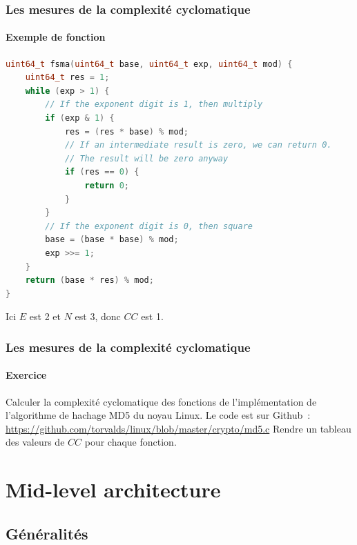 \documentclass{beamer}
\begin{document}
    \begin{frame}[fragile]
        \transdissolve
        \frametitle{Les mesures de la complexité cyclomatique}
        \framesubtitle{Exemple de fonction}
        \begin{lstlisting}[language=c]
uint64_t fsma(uint64_t base, uint64_t exp, uint64_t mod) {
    uint64_t res = 1;
    while (exp > 1) {
        // If the exponent digit is 1, then multiply
        if (exp & 1) {
            res = (res * base) % mod;
            // If an intermediate result is zero, we can return 0.
            // The result will be zero anyway
            if (res == 0) {
                return 0;
            }
        }
        // If the exponent digit is 0, then square
        base = (base * base) % mod;
        exp >>= 1;
    }
    return (base * res) % mod;
}
        \end{lstlisting}

        Ici $E$ est 2 et $N$ est 3, donc $CC$ est 1.
    \end{frame}

    \begin{frame}[fragile]
        \transdissolve
        \frametitle{Les mesures de la complexité cyclomatique}
        \framesubtitle{Exercice \execcounterdispinc{}}
        Calculer la complexité cyclomatique des fonctions de l'implémentation de l'algorithme de hachage MD5 du noyau Linux.
        \bigbreak
        Le code est sur Github~: \url{https://github.com/torvalds/linux/blob/master/crypto/md5.c}
        \bigbreak
        Rendre un tableau des valeurs de $CC$ pour chaque fonction.
    \end{frame}


    \section{Mid-level architecture}\label{sec:mid-level-architecture}

    \subsection{Généralités}\label{subsec:mid-level-generalites}
\end{document}
